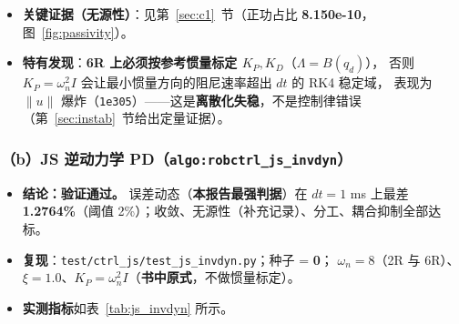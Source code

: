 \documentclass[11pt,a4paper]{ctexart}
\begin{document}
\begin{table}[H]
\centering
\small
\caption{\texttt{js\_pd} 在 2R 与 6R 上的实测指标}\label{tab:js_pd}
\end{table}

\begin{itemize}[leftmargin=1.6em,itemsep=2pt]
\item \textbf{关键证据（无源性）}：见第~\ref{sec:c1}~节（正功占比 \textbf{8.150e-10}，图~\ref{fig:passivity}）。
\item \textbf{特有发现}：\textbf{6R 上必须按参考惯量标定 $K_P,K_D$}（$\Lambda=B(q_d)$），
  否则 $K_P=\omega_n^2I$ 会让最小惯量方向的阻尼速率超出 $dt$ 的 RK4 稳定域，
  表现为 $\|u\|$ 爆炸（\texttt{1e305}）——这是\textbf{离散化失稳}，不是控制律错误
  （第~\ref{sec:instab}~节给出定量证据）。
\end{itemize}

\subsubsection{（b）JS 逆动力学 PD（\texttt{algo:robctrl\_js\_invdyn}）}

\begin{itemize}[leftmargin=1.6em,itemsep=3pt]
\item \textbf{结论：验证通过。} 误差动态（\textbf{本报告最强判据}）在 $dt=1$ ms 上最差
  \textbf{1.2764\%}（阈值 2\%）；收敛、无源性（补充记录）、分工、耦合抑制全部达标。
\item \textbf{复现}：\texttt{test/ctrl\_js/test\_js\_invdyn.py}；种子 = \textbf{0}；
  $\omega_n=8$（2R 与 6R）、$\xi=1.0$、$K_P=\omega_n^2I$（\textbf{书中原式}，不做惯量标定）。
\item \textbf{实测指标}如表~\ref{tab:js_invdyn} 所示。
\end{itemize}
\end{document}
